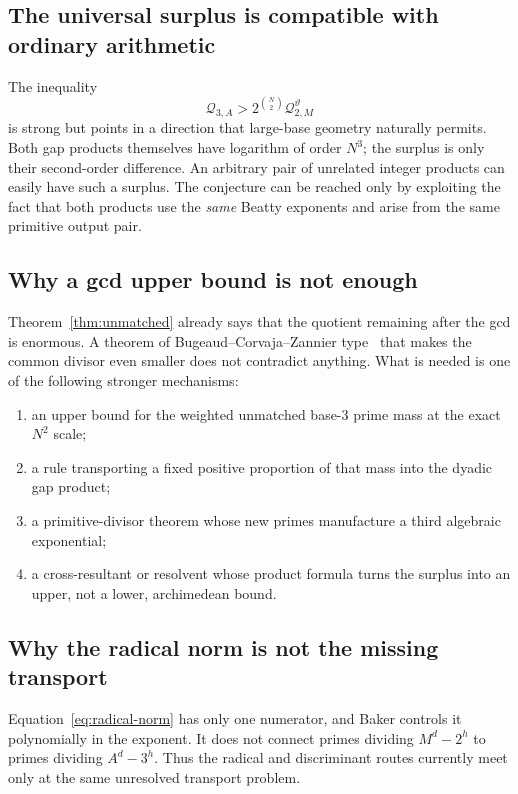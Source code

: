 \documentclass[11pt,oneside]{article}
\theoremstyle{definition}
\theoremstyle{remark}
\newcommand{\thetaq}{\vartheta}
\begin{document}
\subsection{The universal surplus is compatible with ordinary arithmetic}

The inequality
\[
 \mathcal Q_{3,A}>2^{\binom N2}\mathcal Q_{2,M}^{\thetaq}
\]
is strong but points in a direction that large-base geometry naturally permits.  Both gap
products themselves have logarithm of order $N^3$; the surplus is only their second-order
difference.  An arbitrary pair of unrelated integer products can easily have such a surplus.
The conjecture can be reached only by exploiting the fact that both products use the
\emph{same} Beatty exponents and arise from the same primitive output pair.

\subsection{Why a gcd upper bound is not enough}

Theorem~\ref{thm:unmatched} already says that the quotient remaining after the gcd is enormous.
A theorem of Bugeaud--Corvaja--Zannier type~\cite{BCZ} that makes the common divisor even smaller
does not contradict anything.  What is needed is one of the following stronger mechanisms:

\begin{enumerate}
\item an upper bound for the weighted unmatched base-$3$ prime mass at the exact $N^2$ scale;
\item a rule transporting a fixed positive proportion of that mass into the dyadic gap product;
\item a primitive-divisor theorem whose new primes manufacture a third algebraic exponential;
\item a cross-resultant or resolvent whose product formula turns the surplus into an upper, not
      a lower, archimedean bound.
\end{enumerate}

\subsection{Why the radical norm is not the missing transport}

Equation~\eqref{eq:radical-norm} has only one numerator, and Baker controls it polynomially in
the exponent.  It does not connect primes dividing $M^d-2^h$ to primes dividing $A^d-3^h$.
Thus the radical and discriminant routes currently meet only at the same unresolved transport
problem.
\end{document}
